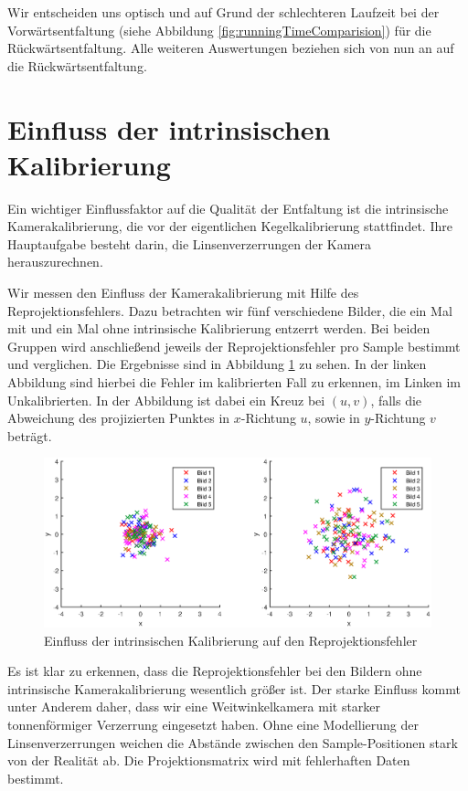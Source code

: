 Wir entscheiden uns optisch und auf Grund der schlechteren Laufzeit bei der Vorwärtsentfaltung (siehe Abbildung \ref{fig:runningTimeComparision}) für die Rückwärtsentfaltung. 
Alle weiteren Auswertungen beziehen sich von nun an auf die Rückwärtsentfaltung.

\section{Einfluss der intrinsischen Kalibrierung}
Ein wichtiger Einflussfaktor auf die Qualität der Entfaltung ist die intrinsische Kamerakalibrierung, die vor der eigentlichen Kegelkalibrierung stattfindet. Ihre Hauptaufgabe besteht darin, die Linsenverzerrungen der Kamera herauszurechnen. 

Wir messen den Einfluss der Kamerakalibrierung mit Hilfe des Reprojektionsfehlers. Dazu betrachten wir fünf verschiedene Bilder, die ein Mal mit und ein Mal ohne intrinsische Kalibrierung entzerrt werden. Bei beiden Gruppen wird anschließend jeweils der Reprojektionsfehler pro Sample bestimmt und verglichen. Die Ergebnisse sind in Abbildung \ref{fig:influenceCalib} zu sehen. In der linken Abbildung sind hierbei die Fehler im kalibrierten Fall zu erkennen, im Linken im Unkalibrierten. In der Abbildung ist dabei ein Kreuz bei $(u,v)$, falls die Abweichung des projizierten Punktes in $x$-Richtung $u$, sowie in $y$-Richtung $v$ beträgt. 

\begin{figure}[!htb]
	\centering
	\includegraphics[width=\textwidth]{images/reprojectionErrorReverse.eps}
	\caption{Einfluss der intrinsischen Kalibrierung auf den Reprojektionsfehler}
	\label{fig:influenceCalib}
\end{figure}


Es ist klar zu erkennen, dass die Reprojektionsfehler bei den Bildern ohne intrinsische Kamerakalibrierung wesentlich größer ist. Der starke Einfluss kommt unter Anderem daher, dass wir eine Weitwinkelkamera mit starker tonnenförmiger Verzerrung eingesetzt haben. Ohne eine Modellierung der Linsenverzerrungen weichen die Abstände zwischen den Sample-Positionen stark von der Realität ab. Die Projektionsmatrix wird mit fehlerhaften Daten bestimmt. 

